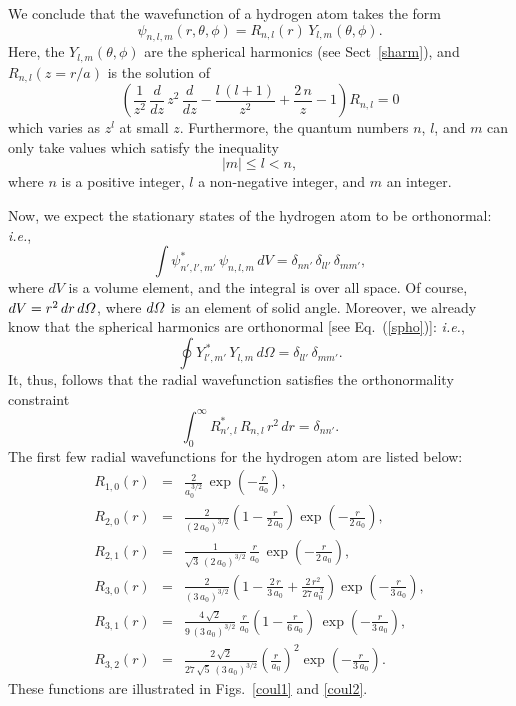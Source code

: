 We conclude that the wavefunction of a hydrogen atom takes the form
\begin{equation}\label{e9.59}
\psi_{n,l,m}(r,\theta,\phi) = R_{n,l}(r)\,Y_{l,m}(\theta,\phi).
\end{equation}
Here, the $Y_{l,m}(\theta,\phi)$ are the spherical harmonics (see Sect~\ref{sharm}), and $R_{n,l}(z=r/a)$ is the solution of
\begin{equation}
\left(\frac{1}{z^2}\,\frac{d}{dz}\,z^2\,\frac{d}{dz}- \frac{l\,(l+1)}{z^2}
+ \frac{2\,n}{z}-1\right) R_{n,l} = 0
\end{equation}
which varies as $z^l$ at small $z$.
Furthermore, the quantum numbers $n$, $l$, and $m$ can only take values
which satisfy the inequality
\begin{equation}\label{e9.61}
|m| \leq l < n,
\end{equation}
where $n$ is a positive integer, $l$ a non-negative integer, and $m$ an integer.

Now, we expect the stationary states of the hydrogen atom to be orthonormal: {\em i.e.},
\begin{equation}
\int \psi^\ast_{n',l',m'}\,\psi_{n,l,m}\,dV = \delta_{nn'}\,\delta_{ll'}\,\delta_{mm'},
\end{equation}
where $dV$ is a volume element, and the integral is over all space. Of
course, $dV = r^2\,dr\,d{\mit\Omega}$, where $d{\mit\Omega}$ is an element
of solid angle. Moreover, we already know that the spherical
harmonics are orthonormal [see Eq.~(\ref{spho})]: {\em i.e.},
\begin{equation}
\oint Y_{l',m'}^{\,\ast}\,Y_{l,m}\,d\Omega = \delta_{ll'}\,\delta_{mm'}.
\end{equation}
It, thus, follows that the radial wavefunction satisfies the
orthonormality constraint
\begin{equation}
\int_0^{\infty} R_{n',l}^\ast\,R_{n,l}\,r^2\,dr = \delta_{nn'}.
\end{equation}
The first few radial wavefunctions for the hydrogen atom are listed below:
\begin{eqnarray}
R_{1,0}(r)&=& \frac{2}{a_0^{\,3/2}}\,\exp\left(-\frac{r}{a_0}\right),\\[0.5ex]
R_{2,0}(r) &=& \frac{2}{(2\,a_0)^{3/2}}\left(1-\frac{r}{2\,a_0}\right)
\exp\left(-\frac{r}{2\,a_0}\right),\\[0.5ex]
R_{2,1}(r)&=& \frac{1}{\sqrt{3}\,(2\,a_0)^{3/2}}\,\frac{r}{a_0}\,
\exp\left(-\frac{r}{2\,a_0}\right),\\[0.5ex]
R_{3,0}(r)&=& \frac{2}{(3\,a_0)^{3/2}}\left(1-
\frac{2\,r}{3\,a_0} + \frac{2\,r^2}{27\,a_0^{\,2}}\right)\exp\left(-\frac{r}{3\,a_0}\right),\\[0.5ex]
R_{3,1}(r) &=& \frac{4\,\sqrt{2}}{9\,(3\,a_0)^{3/2}}\,\frac{r}{a_0}
\left(1-\frac{r}{6\,a_0}\right)\,\exp\left(-\frac{r}{3\,a_0}\right),\\[0.5ex]
R_{3,2}(r)&=& \frac{2\,\sqrt{2}}{27\,\sqrt{5}\,(3\,a_0)^{3/2}}
\left(\frac{r}{a_0}\right)^2 \exp\left(-\frac{r}{3\,a_0}\right).
\end{eqnarray}
These functions are illustrated in Figs.~\ref{coul1} and \ref{coul2}.

